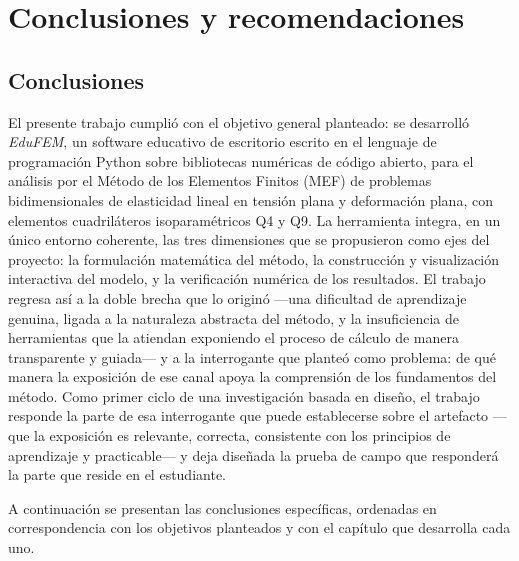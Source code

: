 \chapter*{Conclusiones y recomendaciones}

\section*{Conclusiones}

El presente trabajo cumplió con el objetivo general planteado: se desarrolló \emph{EduFEM}, un software educativo de escritorio escrito en el lenguaje de programación Python sobre bibliotecas numéricas de código abierto, para el análisis por el Método de los Elementos Finitos (MEF) de problemas bidimensionales de elasticidad lineal en tensión plana y deformación plana, con elementos cuadriláteros isoparamétricos Q4 y Q9. La herramienta integra, en un único entorno coherente, las tres dimensiones que se propusieron como ejes del proyecto: la formulación matemática del método, la construcción y visualización interactiva del modelo, y la verificación numérica de los resultados. El trabajo regresa así a la doble brecha que lo originó —una dificultad de aprendizaje genuina, ligada a la naturaleza abstracta del método, y la insuficiencia de herramientas que la atiendan exponiendo el proceso de cálculo de manera transparente y guiada— y a la interrogante que planteó como problema: de qué manera la exposición de ese canal apoya la comprensión de los fundamentos del método. Como primer ciclo de una investigación basada en diseño, el trabajo responde la parte de esa interrogante que puede establecerse sobre el artefacto —que la exposición es relevante, correcta, consistente con los principios de aprendizaje y practicable— y deja diseñada la prueba de campo que responderá la parte que reside en el estudiante.

A continuación se presentan las conclusiones específicas, ordenadas en correspondencia con los objetivos planteados y con el capítulo que desarrolla cada uno.

